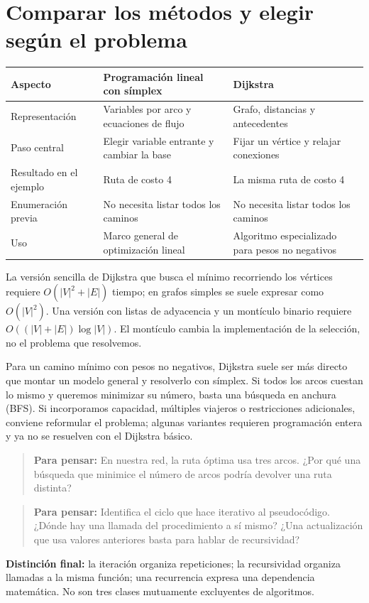 \documentclass[11pt,letterpaper]{article}
\newcommand{\pregunta}[1]{\begin{quote}\color{verde}\textbf{Para pensar:} #1\end{quote}}
\begin{document}
\section{Comparar los métodos y elegir según el problema}
\begin{center}
\begin{tabularx}{\linewidth}{lXX}
\toprule
Aspecto & Programación lineal con símplex & Dijkstra\\
\midrule
Representación & Variables por arco y ecuaciones de flujo & Grafo, distancias y antecedentes\\
Paso central & Elegir variable entrante y cambiar la base & Fijar un vértice y relajar conexiones\\
Resultado en el ejemplo & Ruta de costo 4 & La misma ruta de costo 4\\
Enumeración previa & No necesita listar todos los caminos & No necesita listar todos los caminos\\
Uso & Marco general de optimización lineal & Algoritmo especializado para pesos no negativos\\
\bottomrule
\end{tabularx}
\end{center}
La versión sencilla de Dijkstra que busca el mínimo recorriendo los vértices requiere $O(|V|^2+|E|)$ tiempo; en grafos simples se suele expresar como $O(|V|^2)$. Una versión con listas de adyacencia y un montículo binario requiere $O((|V|+|E|)\log |V|)$. El montículo cambia la implementación de la selección, no el problema que resolvemos.

Para un camino mínimo con pesos no negativos, Dijkstra suele ser más directo que montar un modelo general y resolverlo con símplex. Si todos los arcos cuestan lo mismo y queremos minimizar su número, basta una búsqueda en anchura (BFS). Si incorporamos capacidad, múltiples viajeros o restricciones adicionales, conviene reformular el problema; algunas variantes requieren programación entera y ya no se resuelven con el Dijkstra básico.

\pregunta{En nuestra red, la ruta óptima usa tres arcos. ¿Por qué una búsqueda que minimice el número de arcos podría devolver una ruta distinta?}
\pregunta{Identifica el ciclo que hace iterativo al pseudocódigo. ¿Dónde hay una llamada del procedimiento a sí mismo? ¿Una actualización que usa valores anteriores basta para hablar de recursividad?}

\textbf{Distinción final:} la iteración organiza repeticiones; la recursividad organiza llamadas a la misma función; una recurrencia expresa una dependencia matemática. No son tres clases mutuamente excluyentes de algoritmos.
\end{document}
